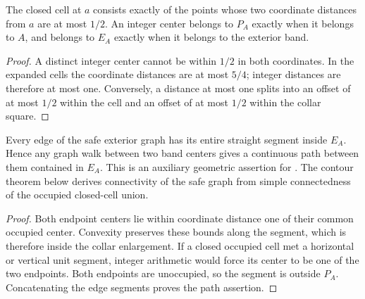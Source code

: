 \begin{lemma}%
    \label{thm:peps_integer_exterior_collar_centers}
    \leanok
    The closed cell at $a$ consists exactly of the points whose two
    coordinate distances from $a$ are at most $1/2$. An integer center
    belongs to $P_A$ exactly when it belongs to $A$, and belongs to
    $E_A$ exactly when it belongs to the exterior band.
\end{lemma}
\begin{proof}\leanok
    A distinct integer center cannot be within $1/2$ in both coordinates.
    In the expanded cells the coordinate distances are at most $5/4$;
    integer distances are therefore at most one. Conversely, a distance
    at most one splits into an offset of at most $1/2$ within the cell
    and an offset of at most $1/2$ within the collar square.
\end{proof}

\begin{lemma}%
    \label{thm:peps_integer_exterior_collar_paths}
    \leanok
    Every edge of the safe exterior graph has its entire straight
    segment inside $E_A$. Hence any graph walk between two band centers
    gives a continuous path between them contained in $E_A$.
    This is an auxiliary geometric assertion for
    \cite[proof of Theorem~6.9]{Schuch2010PEPS}. The contour theorem below derives connectivity of the safe graph
    from simple connectedness of the occupied closed-cell union.
\end{lemma}
\begin{proof}\leanok
    Both endpoint centers lie within coordinate distance one of their
    common occupied center. Convexity preserves these bounds along the
    segment, which is therefore inside the collar enlargement. If a
    closed occupied cell met a horizontal or vertical unit segment,
    integer arithmetic would force its center to be one of the two
    endpoints. Both endpoints are unoccupied, so the segment is outside
    $P_A$. Concatenating the edge segments proves the path assertion.
\end{proof}


